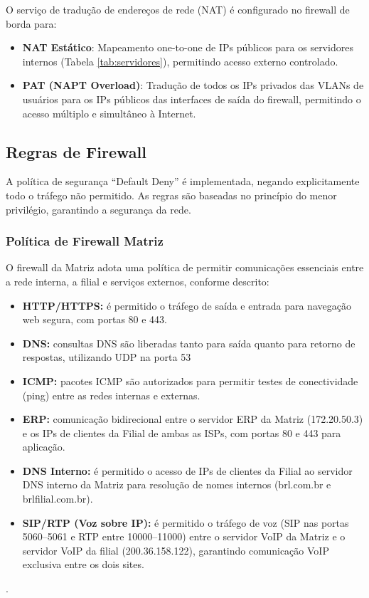\documentclass[a4paper, 12pt]{article}
\begin{document}
O serviço de tradução de endereços de rede (NAT) é configurado no firewall de borda para:
\begin{itemize}
    \item \textbf{NAT Estático}: Mapeamento one-to-one de IPs públicos para os servidores internos (Tabela \ref{tab:servidores}), permitindo acesso externo controlado.
    \item \textbf{PAT (NAPT Overload)}: Tradução de todos os IPs privados das VLANs de usuários para os IPs públicos das interfaces de saída do firewall, permitindo o acesso múltiplo e simultâneo à Internet.
\end{itemize}

\subsection{Regras de Firewall}
\label{subsec:firewall}

A política de segurança ``Default Deny'' é implementada, negando explicitamente todo o tráfego não permitido. As regras são baseadas no princípio do menor privilégio, garantindo a segurança da rede. 

\subsubsection{Política de Firewall Matriz}

O firewall da Matriz adota uma política de permitir comunicações essenciais entre a rede interna, a filial e serviços externos, conforme descrito:

\begin{itemize}
    \item \textbf{HTTP/HTTPS:} é permitido o tráfego de saída e entrada para navegação web segura, com portas 80 e 443.
    \item \textbf{DNS:} consultas DNS são liberadas tanto para saída quanto para retorno de respostas, utilizando UDP na porta 53
    \item \textbf{ICMP:} pacotes ICMP são autorizados para permitir testes de conectividade (ping) entre as redes internas e externas.
    \item \textbf{ERP:} comunicação bidirecional entre o servidor ERP da Matriz (172.20.50.3) e os IPs de clientes da Filial de ambas as ISPs, com portas 80 e 443 para aplicação.
    \item \textbf{DNS Interno:} é permitido o acesso de IPs de clientes da Filial ao servidor DNS interno da Matriz para resolução de nomes internos (brl.com.br e brlfilial.com.br).
    \item \textbf{SIP/RTP (Voz sobre IP):} é permitido o tráfego de voz (SIP nas portas 5060–5061 e RTP entre 10000–11000) entre o servidor VoIP da Matriz e o servidor VoIP da filial (200.36.158.122), garantindo comunicação VoIP exclusiva entre os dois sites.
\end{itemize}.
\end{document}
